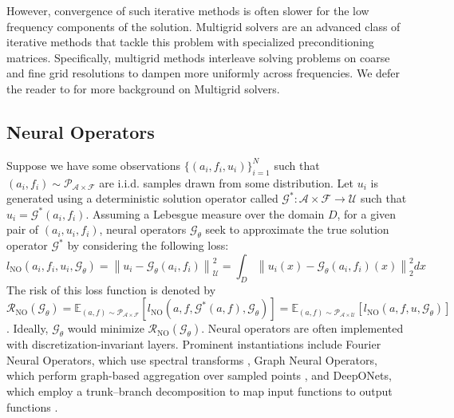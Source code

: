 \documentclass{article} %
\begin{document}
However, convergence of such iterative methods is often slower for the low frequency components of the solution. Multigrid solvers \citep{briggs2000multigrid,trottenberg2001multigrid,hackbusch2013multi} are an advanced class of iterative methods that tackle this problem with specialized preconditioning matrices. Specifically, multigrid methods interleave solving problems on coarse and fine grid resolutions to dampen more uniformly across frequencies.
We defer the reader to  for more background on Multigrid solvers.





\subsection{Neural Operators} \label{sec:neuraloperators}

Suppose we have some observations $\{(a_i, f_i, u_i)\}_{i = 1}^N$ such that $(a_i, f_i) \sim \mathcal{P}_{\mathcal{A} \times \mathcal{F}}$ are i.i.d. samples drawn from some distribution. Let $u_i$ is generated using a deterministic solution operator called $\mathcal{G}^{*} : \mathcal{A} \times \mathcal{F} \to \mathcal{U}$ such that $u_i = \mathcal{G}^{*}(a_i, f_i)$. Assuming a Lebesgue measure over the domain $D$, for a given pair of $(a_i, u_i, f_i)$, neural operators  $\mathcal{G}_{\theta}$ seek to approximate the true solution operator $\mathcal{G}^*$ by considering the following loss:
\begin{equation} \label{eq:NOloss}
    l_{\text{NO}}(a_i, f_i, u_i, \mathcal{G}_{\theta}) = \left\|u_i - \mathcal{G}_{\theta}(a_i, f_i)\right\|^2_{\mathcal{U}} = \int_{D} \left\|u_i(x) - \mathcal{G}_{\theta}(a_i, f_i)(x)\right\|_2^2dx
\end{equation}
The risk of this loss function is denoted by $\mathcal{R}_{\text{NO}}(\mathcal{G}_{\theta}) = \mathbb{E}_{(a, f) \sim  \mathcal{P}_{\mathcal{A} \times \mathcal{F}}}\left[l_{\text{NO}}(a, f, \mathcal{G}^{*}(a, f), \mathcal{G}_{\theta})\right] = \mathbb{E}_{(a, f) \sim  \mathcal{P}_{\mathcal{A} \times \mathcal{U}}}\left[l_{\text{NO}}(a, f, u, \mathcal{G}_{\theta})\right]$. Ideally, $\mathcal{G}_{\theta}$ would minimize $\mathcal{R}_{\text{NO}}(\mathcal{G}_{\theta})$. Neural operators are often implemented with discretization-invariant layers. Prominent instantiations include Fourier Neural Operators, which use spectral transforms \citep{li2020fourier}, Graph Neural Operators, which perform graph-based aggregation over sampled points \citep{li2020multipole}, and DeepONets, which employ a trunk–branch decomposition to map input functions to output functions \citep{lu2021learning}. 
\end{document}
